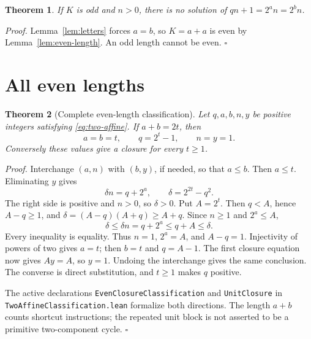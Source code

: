 \documentclass[11pt,letterpaper]{article}
\newtheorem{theorem}{Theorem}
\newenvironment{proof}{\noindent\textit{Proof.}}{\hfill\(\square\)}
\begin{document}
\begin{theorem}
\label{thm:odd-length}
If \(K\) is odd and \(n > 0\), there is no solution of \(q n + 1 = 2^{a} n = 2^{b} n\).
\end{theorem}

\begin{proof}
Lemma~\ref{lem:letters} forces \(a = b\), so \(K = a + a\) is even by Lemma~\ref{lem:even-length}. An odd length cannot be even.
\end{proof}

\section{All even lengths}

\begin{theorem}[Complete even-length classification]
\label{thm:even-complete}
Let \(q,a,b,n,y\) be positive integers satisfying \eqref{eq:two-affine}.
If \(a+b=2t\), then
\[
a=b=t,\qquad q=2^t-1,\qquad n=y=1.
\]
Conversely these values give a closure for every \(t\ge1\).
\end{theorem}

\begin{proof}
Interchange \((a,n)\) with \((b,y)\), if needed, so that \(a\le b\).
Then \(a\le t\).
Eliminating \(y\) gives
\[
\delta n=q+2^a,\qquad \delta=2^{2t}-q^2.
\]
The right side is positive and \(n>0\), so \(\delta>0\).
Put \(A=2^t\). Then \(q<A\), hence \(A-q\ge1\), and
\(\delta=(A-q)(A+q)\ge A+q\).
Since \(n\ge1\) and \(2^a\le A\),
\[
\delta\le\delta n=q+2^a\le q+A\le\delta.
\]
Every inequality is equality.
Thus \(n=1\), \(2^a=A\), and \(A-q=1\).
Injectivity of powers of two gives \(a=t\); then \(b=t\) and \(q=A-1\).
The first closure equation now gives \(Ay=A\), so \(y=1\).
Undoing the interchange gives the same conclusion.
The converse is direct substitution, and \(t\ge1\) makes \(q\) positive.

The active declarations \texttt{EvenClosureClassification} and
\texttt{UnitClosure} in \texttt{TwoAffineClassification.lean} formalize both directions.
The length \(a+b\) counts shortcut instructions; the repeated unit block is not asserted to be a primitive two-component cycle.
\end{proof}
\end{document}
